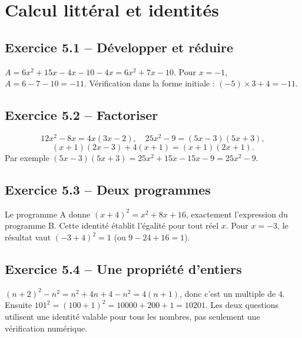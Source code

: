 \chapter{Calcul littéral et identités}
\label{corriges:05}
\section*{Exercice 5.1 -- Développer et réduire}
$A=6x^2+15x-4x-10-4x=6x^2+7x-10$.
Pour $x=-1$, $A=6-7-10=-11$. Vérification dans la forme initiale : $(-5)\times3+4=-11$.

\section*{Exercice 5.2 -- Factoriser}
\[
12x^2-8x=4x(3x-2),\quad25x^2-9=(5x-3)(5x+3),
\]
\[
(x+1)(2x-3)+4(x+1)=(x+1)(2x+1).
\]
Par exemple $(5x-3)(5x+3)=25x^2+15x-15x-9=25x^2-9$.

\section*{Exercice 5.3 -- Deux programmes}
Le programme A donne $(x+4)^2=x^2+8x+16$, exactement l'expression du programme B. Cette identité établit l'égalité pour tout réel $x$. Pour $x=-3$, le résultat vaut $(-3+4)^2=1$ (ou $9-24+16=1$).

\section*{Exercice 5.4 -- Une propriété d'entiers}
$(n+2)^2-n^2=n^2+4n+4-n^2=4(n+1)$, donc c'est un multiple de $4$. Ensuite $101^2=(100+1)^2=10000+200+1=10201$. Les deux questions utilisent une identité valable pour tous les nombres, pas seulement une vérification numérique.
